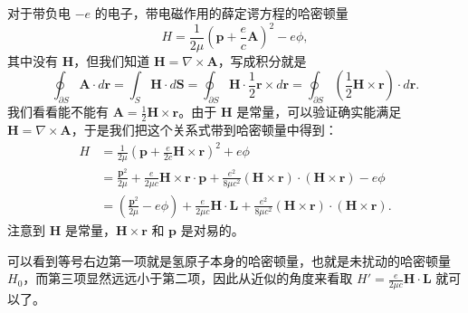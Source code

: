 对于带负电 $-e$ 的电子，带电磁作用的薛定谔方程的哈密顿量
\begin{equation}
	H = \frac{1}{2 \mu} \left( \boldsymbol{p} + \frac{e}{c} \boldsymbol{A} \right)^{2} - e \phi,
\end{equation}
其中没有 $\boldsymbol{H}$，但我们知道 $\boldsymbol{H} = \nabla \times \boldsymbol{A}$，写成积分就是
\begin{equation}
	\oint_{\partial S} \boldsymbol{A} \cdot d\boldsymbol{r} = \int_{S} \boldsymbol{H} \cdot d\boldsymbol{S} = \oint_{\partial S} \boldsymbol{H} \cdot \frac{1}{2}\boldsymbol{r} \times d\boldsymbol{r} = \oint_{\partial S} \left( \frac{1}{2} \boldsymbol{H} \times \boldsymbol{r} \right) \cdot d\boldsymbol{r}.
\end{equation}
我们看看能不能有 $\boldsymbol{A} = \frac{1}{2} \boldsymbol{H} \times \boldsymbol{r}$。由于 $\boldsymbol{H}$ 是常量，可以验证确实能满足 $\boldsymbol{H} = \nabla \times \boldsymbol{A}$，于是我们把这个关系式带到哈密顿量中得到：
\begin{align}
	H &= \frac{1}{2 \mu} \left( \boldsymbol{p} + \frac{e}{2c} \boldsymbol{H} \times \boldsymbol{r} \right)^2 + e \phi \nonumber \\
	&= \frac{\boldsymbol{p}^{2}}{2 \mu} + \frac{e}{2 \mu c} \boldsymbol{H} \times \boldsymbol{r} \cdot \boldsymbol{p} + \frac{e^{2}}{8 \mu c^{2}}(\boldsymbol{H} \times \boldsymbol{r}) \cdot (\boldsymbol{H} \times \boldsymbol{r}) - e \phi \nonumber \\
	&= \left( \frac{\boldsymbol{p}^{2}}{2 \mu} - e \phi \right) + \frac{e}{2 \mu c} \boldsymbol{H} \cdot \boldsymbol{L} + \frac{e^{2}}{8 \mu c^{2}}(\boldsymbol{H} \times \boldsymbol{r}) \cdot (\boldsymbol{H} \times \boldsymbol{r}).
\end{align}
注意到 $\boldsymbol{H}$ 是常量，$\boldsymbol{H} \times \boldsymbol{r}$ 和 $\boldsymbol{p}$ 是对易的。

可以看到等号右边第一项就是氢原子本身的哈密顿量，也就是未扰动的哈密顿量 $H_{0}$，而第三项显然远远小于第二项，因此从近似的角度来看取 $H'=\frac{e}{2\mu c}\boldsymbol{H}\cdot \boldsymbol{L}$ 就可以了。

